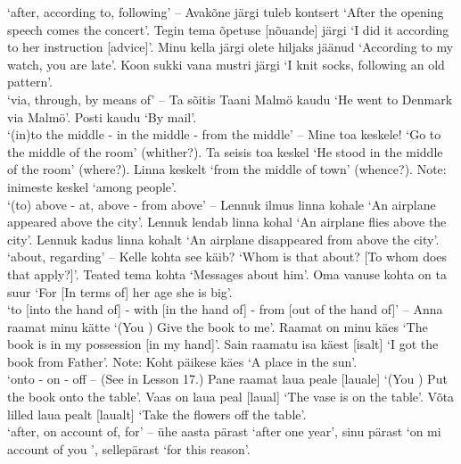  `after, according to, following' -- Avakõne järgi tuleb kontsert `After the opening speech comes the concert'. Tegin tema õpetuse [nõuande] järgi `I did it according to her instruction [advice]'. Minu kella järgi olete hiljaks jäänud `According to my watch, you \pl are late'. Koon sukki vana mustri järgi `I knit socks, following an old pattern'. \\

 `via, through, by means of' -- Ta sõitis Taani Malmö kaudu `He went to Denmark via Malmö'. Posti kaudu `By mail'. \\

 `(in)to the middle - in the middle - from the middle' -- Mine toa keskele! `Go to the middle of the room' (whither?). Ta seisis toa keskel `He stood in the middle of the room' (where?). Linna keskelt `from the middle of town' (whence?). Note: inimeste keskel `among people'. \\

 `(to) above - at, above - from above' -- Lennuk ilmus linna kohale `An airplane appeared above the city'. Lennuk lendab linna kohal `An airplane flies above the city'. Lennuk kadus linna kohalt `An airplane disappeared from above the city'. \\

 `about, regarding' -- Kelle kohta see käib? `Whom is that about? [To whom does that apply?]'. Teated tema kohta `Messages about him'. Oma vanuse kohta on ta suur `For [In terms of] her age she is big'. \\

 `to [into the hand of] - with [in the hand of] - from [out of the hand of]' -- Anna raamat minu kätte `(You \sing) Give the book to me'. Raamat on minu käes `The book is in my possession [in my hand]'. Sain raamatu isa käest [isalt] `I got the book from Father'. Note: Koht päikese käes `A place in the sun'. \\

 `onto - on - off -- (See  in Lesson 17.) Pane raamat laua peale [lauale] `(You \sing) Put the book onto the table'. Vaas on laua peal [laual] `The vase is on the table'. Võta lilled laua pealt [laualt] `Take the flowers off the table'. \\

 `after, on account of, for' -- ühe aasta pärast `after one year', sinu pärast `on mi account of you \sing', sellepärast `for this reason'. \\

